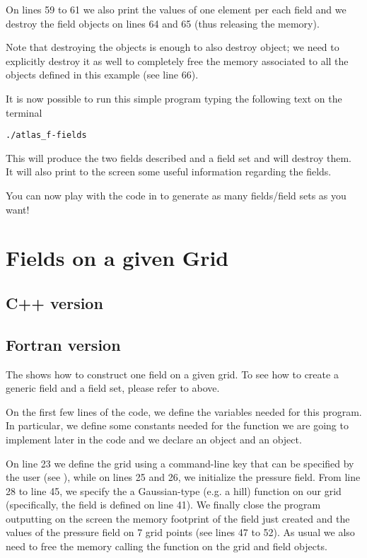 On lines 59 to 61 we also print the values of one element 
per each field and we destroy the field objects on lines 
64 and 65 (thus releasing the memory).

Note that destroying the  objects 
is enough to also destroy  object;
we need to explicitly destroy it as well to completely 
free the memory associated to all the objects defined 
in this example (see line 66).

It is now possible to run this simple program typing
the following text on the terminal
%
\begin{lstlisting}[style=BashStyle]
./atlas_f-fields
\end{lstlisting}
% 
This will produce the two fields described and a field 
set and will destroy them. It will also print to the 
screen some useful information regarding the fields.

You can now play with the code in  
to generate as many fields/field sets as you want! 




\section{Fields on a given Grid}
\label{sect:grid-fields}
\subsection{C++ version}


\subsection{Fortran version}
The  shows how to construct one field
on a given grid. To see how to create a generic field and 
a field set, please refer to 
above. 
%

%
On the first few lines of the code, we define the variables
needed for this program. In particular, we define some constants 
needed for the function we are going to implement later in the 
code and we declare an  object and 
an  object.

On line 23 we define the grid using a command-line key 
that can be specified by the user (see ), 
while on lines 25 and 26, we initialize the pressure field.
From line 28 to line 45, we specify the a Gaussian-type 
(e.g. a hill) function on our grid (specifically, the 
field is defined on line 41).
We finally close the program outputting on the screen 
the memory footprint of the field just created and the 
values of the pressure field on 7 grid points (see lines 
47 to 52).
As usual we also need to free the memory calling the 
function  on the grid and field objects.

